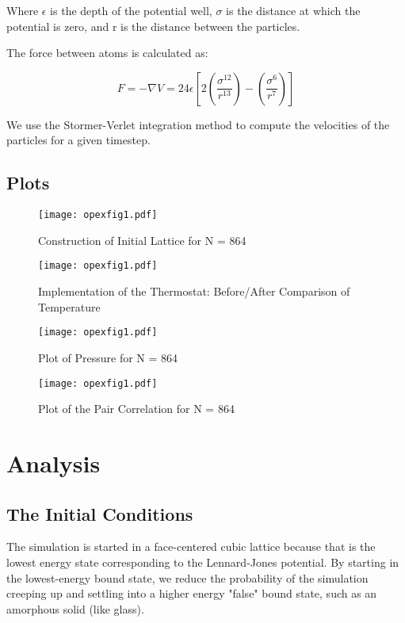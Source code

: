 \documentclass[10pt,letterpaper]{article}
\begin{document}
Where $\epsilon$ is the depth of the potential well, $\sigma$ is the distance at which the potential is zero, and r is the distance between the particles.

The force between atoms is calculated as:

\begin{equation}
F = -{\nabla}{V} = 24{\epsilon}[2(\frac{\sigma^{12}}{r^{13}}) - (\frac{\sigma^6}{r^7})]
\end{equation}

We use the Stormer-Verlet integration method to compute the velocities of the particles for a given timestep.




\subsection{Plots}

\begin{figure}[H]
\centering
\texttt{[image: opexfig1.pdf]} %
\caption{Construction of Initial Lattice for N = 864} %
\end{figure}

\begin{figure}[H]
\centering
\texttt{[image: opexfig1.pdf]} %
\caption{Implementation of the Thermostat: Before/After Comparison of Temperature}
\end{figure}

\begin{figure}[H]
\centering
\texttt{[image: opexfig1.pdf]} %
\caption{Plot of Pressure for N = 864} %
\end{figure}

\begin{figure}[H]
\centering
\texttt{[image: opexfig1.pdf]} %
\caption{Plot of the Pair Correlation for N = 864} %
\end{figure}


\section{Analysis}

\subsection{The Initial Conditions}

The simulation is started in a face-centered cubic lattice because that is the lowest energy state corresponding to the Lennard-Jones potential. By starting in the lowest-energy bound state, we reduce the probability of the simulation creeping up and settling into a higher energy "false" bound state, such as an amorphous solid (like glass).
\end{document}
